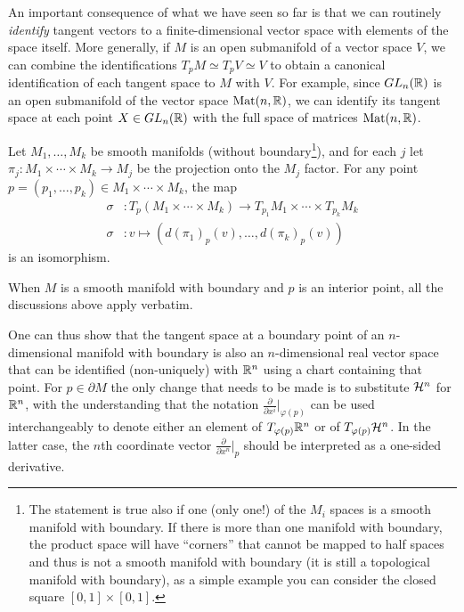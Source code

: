 An important consequence of what we have seen so far is that we can routinely \emph{identify} tangent vectors to a finite-dimensional vector space with elements of the space itself.
More generally, if $M$ is an open submanifold of a vector space $V$, we can combine the identifications $T_p M \simeq T_p V \simeq V$ to obtain a canonical identification of each tangent space to $M$ with $V$.
For example, since $GL_n(\mathbb{R})$ is an open submanifold of the vector space $\mathrm{Mat}(n, \mathbb{R})$, we can identify its tangent space at each point $X\in GL_n(\mathbb{R})$ with the full space of matrices $\mathrm{Mat}(n, \mathbb{R})$.

\begin{exercise}
	Let $M_1, \ldots, M_k$ be smooth manifolds (without boundary\footnote{The statement is true also if one (only one!) of the $M_i$ spaces is a smooth manifold with boundary. If there is more than one manifold with boundary, the product space will have ``corners'' that cannot be mapped to half spaces and thus is not a smooth manifold with boundary (it is still a topological manifold with boundary), as a simple example you can consider the closed square $[0,1]\times [0,1]$.}), and for each $j$ let $\pi_j:M_1\times\cdots\times M_k \to M_j$ be the projection onto the $M_j$ factor.
	For any point $p=(p_1,\ldots,p_k)\in M_1\times\cdots\times M_k$, the map
	\begin{align}
		\sigma & : T_p(M_1\times\cdots\times M_k) \to T_{p_1} M_1\times\cdots\times T_{p_k} M_k \\
		\sigma & : v \mapsto \left(d(\pi_1)_p(v), \ldots, d(\pi_k)_p(v)\right)
	\end{align}
	is an isomorphism.
\end{exercise}

\begin{remark}
	When $M$ is a smooth manifold with boundary and $p$ is an interior point, all the discussions above apply verbatim.

	One can thus show that the tangent space at a boundary point of an $n$-dimensional manifold with boundary is also an $n$-dimensional real vector space that can be identified (non-uniquely) with $\mathbb{R}^n$ using a chart containing that point.
	For $p\in\partial M$ the only change that needs to be made is to substitute $\mathcal{H}^n$ for $\mathbb{R}^n$, with the understanding that the notation $\frac{\partial}{\partial x^i}\big|_{\varphi(p)}$ can be used interchangeably to denote either an element of $T_{\varphi(p)}\mathbb{R}^n$ or of $T_{\varphi(p)}\mathcal{H}^n$. In the latter case, the $n$th coordinate vector $\frac{\partial}{\partial x^n}\big|_{p}$ should be interpreted as a one-sided derivative.
\end{remark}

